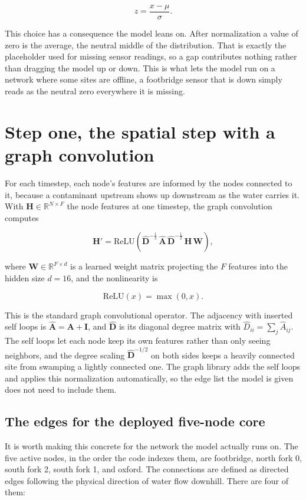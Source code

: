 \documentclass[11pt]{article}
\begin{document}
\[
z = \frac{x - \mu}{\sigma}.
\]

This choice has a consequence the model leans on. After normalization a value of zero is the average, the neutral middle of the distribution. That is exactly the placeholder used for missing sensor readings, so a gap contributes nothing rather than dragging the model up or down. This is what lets the model run on a network where some sites are offline, a footbridge sensor that is down simply reads as the neutral zero everywhere it is missing.

\section*{Step one, the spatial step with a graph convolution}

For each timestep, each node's features are informed by the nodes connected to it, because a contaminant upstream shows up downstream as the water carries it. With $\mathbf{H} \in \mathbb{R}^{N \times F}$ the node features at one timestep, the graph convolution computes

\[
\mathbf{H}' = \mathrm{ReLU}\!\left( \hat{\mathbf{D}}^{-\frac{1}{2}} \, \hat{\mathbf{A}} \, \hat{\mathbf{D}}^{-\frac{1}{2}} \, \mathbf{H} \, \mathbf{W} \right),
\]

where $\mathbf{W} \in \mathbb{R}^{F \times d}$ is a learned weight matrix projecting the $F$ features into the hidden size $d = 16$, and the nonlinearity is

\[
\mathrm{ReLU}(x) = \max(0, x).
\]

This is the standard graph convolutional operator. The adjacency with inserted self loops is $\hat{\mathbf{A}} = \mathbf{A} + \mathbf{I}$, and $\hat{\mathbf{D}}$ is its diagonal degree matrix with $\hat{D}_{ii} = \sum_j \hat{A}_{ij}$. The self loops let each node keep its own features rather than only seeing neighbors, and the degree scaling $\hat{\mathbf{D}}^{-1/2}$ on both sides keeps a heavily connected site from swamping a lightly connected one. The graph library adds the self loops and applies this normalization automatically, so the edge list the model is given does not need to include them.

\subsection*{The edges for the deployed five-node core}

It is worth making this concrete for the network the model actually runs on. The five active nodes, in the order the code indexes them, are footbridge, north fork 0, south fork 2, south fork 1, and oxford. The connections are defined as directed edges following the physical direction of water flow downhill. There are four of them:
\end{document}
